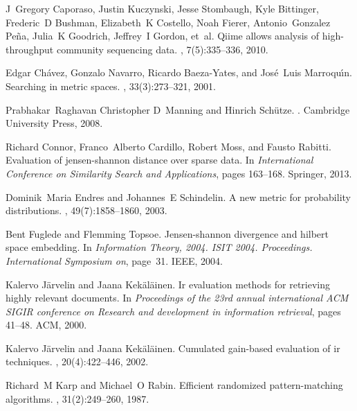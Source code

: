 \documentclass[10pt,letterpaper]{article}
\begin{document}
\begin{thebibliography}{10}

J~Gregory Caporaso, Justin Kuczynski, Jesse Stombaugh, Kyle Bittinger,
  Frederic~D Bushman, Elizabeth~K Costello, Noah Fierer, Antonio~Gonzalez
  Pe{\~n}a, Julia~K Goodrich, Jeffrey~I Gordon, et~al.
\newblock Qiime allows analysis of high-throughput community sequencing data.
, 7(5):335--336, 2010.

Edgar Ch{\'a}vez, Gonzalo Navarro, Ricardo Baeza-Yates, and Jos{\'e}~Luis
  Marroqu{\'\i}n.
\newblock Searching in metric spaces.
, 33(3):273--321, 2001.

Prabhakar~Raghavan Christopher D~Manning and Hinrich Schütze.
.
\newblock Cambridge University Press, 2008.

Richard Connor, Franco~Alberto Cardillo, Robert Moss, and Fausto Rabitti.
\newblock Evaluation of jensen-shannon distance over sparse data.
\newblock In {\em International Conference on Similarity Search and
  Applications}, pages 163--168. Springer, 2013.

Dominik~Maria Endres and Johannes~E Schindelin.
\newblock A new metric for probability distributions.
, 49(7):1858--1860,
  2003.

Bent Fuglede and Flemming Topsoe.
\newblock Jensen-shannon divergence and hilbert space embedding.
\newblock In {\em Information Theory, 2004. ISIT 2004. Proceedings.
  International Symposium on}, page~31. IEEE, 2004.

Kalervo J{\"a}rvelin and Jaana Kek{\"a}l{\"a}inen.
\newblock Ir evaluation methods for retrieving highly relevant documents.
\newblock In {\em Proceedings of the 23rd annual international ACM SIGIR
  conference on Research and development in information retrieval}, pages
  41--48. ACM, 2000.

Kalervo J{\"a}rvelin and Jaana Kek{\"a}l{\"a}inen.
\newblock Cumulated gain-based evaluation of ir techniques.
, 20(4):422--446,
  2002.

Richard~M Karp and Michael~O Rabin.
\newblock Efficient randomized pattern-matching algorithms.
, 31(2):249--260, 1987.


\end{thebibliography}
\end{document}
